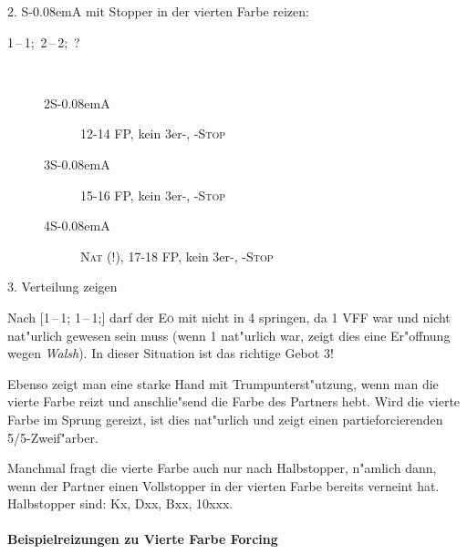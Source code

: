 \documentclass[11pt,german,twocolumn]{scrartcl}
\def\pik{\nobreak\hspace{\cardskip}\Sp\xspace}
\def\coe{\nobreak\hspace{\cardskip}\He\xspace}
\def\kar{\nobreak\hspace{\cardskip}\Di\xspace}
\def\tre{\nobreak\hspace{\cardskip}\Cl\xspace}
\def\pi{\Sp\xspace}
\def\ka{\Di\xspace}
\def\sa{\nobreak\textsf{S\kern-0.08emA}\xspace}
\def\SA{\nobreak\hspace{\cardskip}\sa}
\def\sep{\,--\,}
\newcommand{\conv}[1]{\emph{#1}}
\def\nat{\textsc{Nat}\xspace}
\def\stp{\textsc{Stop}\xspace}
\def\eo{\textsc{E\"o}\xspace}
\begin{document}
2. \sa mit Stopper in der vierten Farbe reizen:
\begin{description}
\item[1\coe{}\sep1\pik;~2\tre{}\sep2\kar;~?]~
  \begin{description}
    \item[2\SA] 12-14 FP, kein 3er-\pi, \ka-\stp
    \item[3\SA] 15-16 FP, kein 3er-\pi, \ka-\stp
    \item[4\SA] \nat{} (!), 17-18 FP, kein 3er-\pi, \ka-\stp
  \end{description}
\end{description}

3. Verteilung zeigen

Nach [1\tre{}\sep1\kar; 1\coe{}\sep1\pik;] darf der \eo mit
 nicht in 4\pik springen, da 1\pik VFF war
und nicht nat"urlich gewesen sein muss (wenn 1\pik nat"urlich war,
zeigt dies eine Er"offnung wegen \conv{Walsh}). In dieser Situation
ist das richtige Gebot 3\coe!

Ebenso zeigt man eine starke Hand mit Trumpunterst"utzung, wenn man die vierte
Farbe reizt und anschlie"send die Farbe des Partners hebt. Wird die vierte
Farbe im Sprung gereizt, ist dies nat"urlich und zeigt einen partieforcierenden
5/5-Zweif"arber.

Manchmal fragt die vierte Farbe auch nur nach Halbstopper, n"amlich dann, wenn
der Partner einen Vollstopper in der vierten Farbe bereits verneint hat.
Halbstopper sind: Kx, Dxx, Bxx, 10xxx.

\paragraph{Beispielreizungen zu Vierte Farbe Forcing} ~
\end{document}
